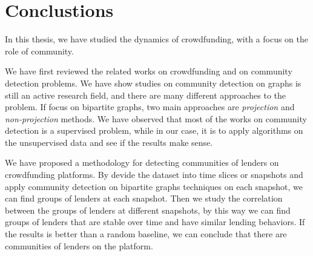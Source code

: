 \section{Conclustions}
\begin{comment}

This community finding is a unsupervised problem.
Hence, there are different methodology for answer the question


SOmething to try

- \lstinline|adjusted_rand_score|

\section{Future works}

\begin{itemize}
	\item Extend to other platforms
	\item Transform the problem into a classical clustering problem where cluster is a Tag/Sector
	      and apply classical dynamic clustering tools.
	      Note that this part is currently in trying phase.
	      If we have time to make it now, we could move it to the section 4.
\end{itemize}
\end{comment}

In this thesis, we have studied the dynamics of crowdfunding, with a focus on the role of community.

We have first reviewed the related works on crowdfunding and on community detection problems.
We have show studies on community detection on graphs is still an active research field,
and there are many different approaches to the problem.
If focus on bipartite graphs, two main approaches are \textit{projection} and \textit{non-projection} methods.
We have observed that most of the works on community detection is a supervised problem,
while in our case, it is to apply algorithms on the unsupervised data and see if the results make sense.

We have proposed a methodology for detecting communities of lenders on crowdfunding platforms.
By devide the dataset into time slices or snapshots
and apply community detection on bipartite graphs techniques on each snapshot,
we can find groups of lenders at each snapshot.
Then we study the correlation between the groups of lenders at different snapshots,
by this way we can find groups of lenders that are stable over time and have similar lending behaviors.
If the results is better than a random baseline, we can conclude that there are communities of lenders on the platform.

